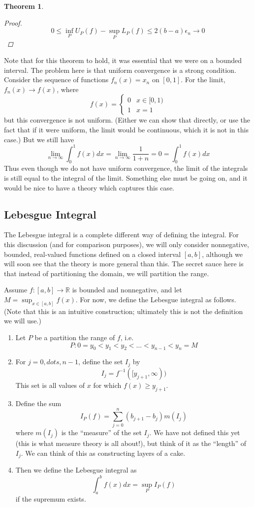 \documentclass[10pt]{article}         %
\newtheorem{theorem}{Theorem}[section]
\theoremstyle{remark}
\newcommand{\R}{\mathbb{R}}
\begin{document}
\begin{itemize}
\begin{theorem}
\begin{proof}
    \[
    0 \leq \inf_P U_P(f) - \sup_P L_P(f) \leq 2(b-a)\epsilon_n \rightarrow 0
    \]
    \end{proof}
    \end{theorem}
    Note that for this theorem to hold, it was essential that we were on a bounded interval. The problem here is that uniform convergence is a strong condition. Consider the sequence of functions $f_n(x) = x_n$ on $[0, 1]$. For the limit, $f_n(x) \rightarrow f(x)$, where
    \[
    f(x) = \begin{cases}
    0 & x \in [0, 1) \\
    1 & x = 1
    \end{cases}
    \]
    but this convergence is not uniform. (Either we can show that directly, or use the fact that if it were uniform, the limit would be continuous, which it is not in this case.) But we still have
    \[
    \lim_{n \rightarrow \infty} \int_0^1 f(x) dx = \lim_{n \rightarrow \infty} \frac{1}{1+n} = 0 = \int_0^1 f(x) dx
    \]
    Thus even though we do not have uniform convergence, the limit of the integrals is still equal to the integral of the limit. Something else must be going on, and it would be nice to have a theory which captures this case.
\end{itemize}

\subsection{Lebesgue Integral}

The Lebesgue integral is a complete different way of defining the integral. For this discussion (and for comparison purposes), we will only consider nonnegative, bounded, real-valued functions defined on a closed interval $[a, b]$, although we will soon see that the theory is more general than this. The secret sauce here is that instead of partitioning the domain, we will partition the range.

Assume $f:[a,b] \rightarrow \R$ is bounded and nonnegative, and let $M = \sup_{x \in [a,b]} f(x)$. For now, we define the Lebesgue integral as follows. (Note that this is an intuitive construction; ultimately this is not the definition we will use.)
\begin{enumerate}
\item Let $P$ be a partition the range of $f$, i.e.
\[
P : 0 = y_0 < y_1 < y_2 < \dots < y_{n-1} < y_n = M
\]
\item For $j = 0, dots, n-1$, define the set $I_j$ by
\[
I_j = f^{-1}([y_{j+1}, \infty))
\]
This set is all values of $x$ for which $f(x) \geq y_{j+1}$.
\item Define the sum
\[
I_P(f) = \sum_{j=0}^{n}(b_{j+1}-b_{j})m(I_j)
\]
where $m(I_j)$ is the ``measure'' of the set $I_j$. We have not defined this yet (this is what measure theory is all about!), but think of it as the ``length'' of $I_j$.  We can think of this as constructing layers of a cake. 
\item Then we define the Lebesgue integral as
\[
\int_{a}^{b}f(x)dx = \sup_P I_P(f)
\]
if the supremum exists.
\end{enumerate}
\end{document}
